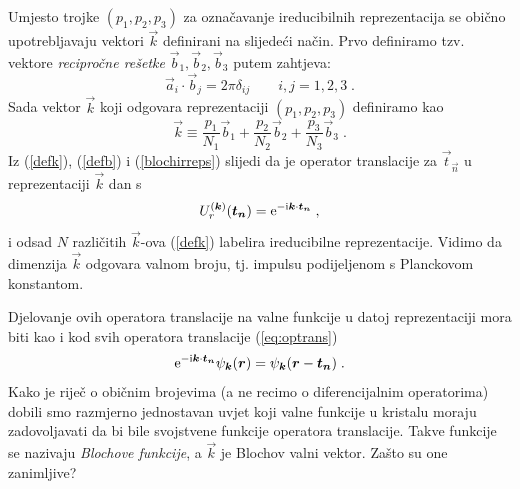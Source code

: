 Umjesto trojke $(p_1, p_2, p_3)$ za označavanje ireducibilnih reprezentacija se obično
upotrebljavaju vektori $\vec{k}$ definirani na slijedeći način. Prvo
definiramo tzv. vektore \emph{recipročne rešetke} $\vec{b}_1, \vec{b}_2,
\vec{b}_3$ putem zahtjeva:
\begin{equation}
   \vec{a}_i\cdot \vec{b}_j = 2 \pi \delta_{ij} \qquad i,j = 1, 2, 3 \;.
\label{defb}
\end{equation}
Sada vektor $\vec{k}$ koji odgovara reprezentaciji
$(p_1, p_2, p_3)$ definiramo kao
\begin{equation}
  \vec{k} \equiv \frac{p_1}{N_1}\vec{b}_1 + \frac{p_2}{N_2}\vec{b}_2 + 
  \frac{p_3}{N_3}\vec{b}_3 \;.
\label{defk}
\end{equation}
Iz (\ref{defk}), (\ref{defb}) i (\ref{blochirreps}) slijedi da je
operator translacije za $\vec{t}_{\vec{n}}$ u reprezentaciji $\vec{k}$
dan s
\begin{equation}
 U_{r}^{(\vec{k})} (\vec{t}_{\vec{n}}) = 
 \rme^{-\rmi \vec{k}\cdot \vec{t}_{\vec{n}}} \;,
\end{equation}
i odsad $N$ različitih $\vec{k}$-ova (\ref{defk}) labelira ireducibilne reprezentacije.
Vidimo da dimenzija $\vec{k}$ odgovara valnom broju, tj. impulsu
podijeljenom s Planckovom konstantom.

Djelovanje ovih operatora translacije na valne funkcije u datoj
reprezentaciji mora biti kao i kod svih operatora translacije (\ref{eq:optrans})
\begin{equation}
 \rme^{-\rmi \vec{k}\cdot \vec{t}_{\vec{n}}} \psi_{\vec{k}}(\vec{r}) =
\psi_{\vec{k}}(\vec{r} - \vec{t}_{\vec{n}}) \;.
\label{bloch}
\end{equation}
Kako je riječ o običnim brojevima (a ne recimo o diferencijalnim
operatorima) dobili smo razmjerno jednostavan uvjet koji valne funkcije
u kristalu moraju zadovoljavati da bi bile svojstvene funkcije operatora
translacije. Takve funkcije se nazivaju \emph{Blochove funkcije}, a
$\vec{k}$ je Blochov valni vektor. 
Zašto su one zanimljive?

